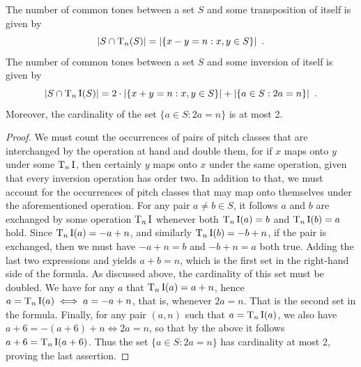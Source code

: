 \begin{theorem}
	\label{rahn-common-tone}
	\cite[10]{Rahn1975}
	The number of common tones between a set $S$ and some transposition of itself is given by
	\begin{equation}
		|S \cap \operatorname{T}_n(S)| = |\{x - y = n : x, y \in S\}| \enspace.
	\end{equation}
	The number of common tones between a set $S$ and some inversion of itself is given by
	\begin{equation}
		|S \cap \operatorname{T}_n\operatorname{I}(S)| = 2 \cdot |\{x + y = n : x, y \in S\}| + |\{a \in S : 2a = n\}| \enspace.
	\end{equation}
	Moreover, the cardinality of the set $\{a \in S : 2a = n\}$ is at most 2.
	\begin{proof}
		We must count the occurrences of pairs of pitch classes that are interchanged by the operation at hand and double them, for if $x$ maps onto $y$ under some $\operatorname{T}_n\operatorname{I}$, then certainly $y$ maps onto $x$ under the same operation, given that every inversion operation has order two. In addition to that, we must account for the occurrences of pitch classes that may map onto themselves under the aforementioned operation. For any pair $a \ne b \in S$, it follows $a$ and $b$ are exchanged by some operation $\operatorname{T}_n\operatorname{I}$ whenever both $\operatorname{T}_n\operatorname{I}(a) = b$ and $\operatorname{T}_n\operatorname{I}(b) = a$ hold. Since $\operatorname{T}_n\operatorname{I}(a) = -a + n$, and similarly $\operatorname{T}_n\operatorname{I}(b) = -b + n$, if the pair is exchanged, then we must have $-a + n = b$ and $-b + n = a$ both true. Adding the last two expressions and yields $a + b = n$, which is the first set in the right-hand side of the formula. As discussed above, the cardinality of this set must be doubled. We have for any $a$ that $\operatorname{T}_n\operatorname{I}(a) = a + n$, hence $a = \operatorname{T}_n\operatorname{I}(a) \iff a = -a + n$, that is, whenever $2a = n$. That is the second set in the formula. Finally, for any pair $(a, n)$ such that $a = \operatorname{T}_n\operatorname{I}(a)$, we also have $a + 6 = -(a + 6) + n \iff 2a = n$, so that by the above it follows $a + 6 = \operatorname{T}_n\operatorname{I}(a + 6)$. Thus the set $\{a \in S : 2a = n\}$ has cardinality at most 2, proving the last assertion.
	\end{proof}
\end{theorem}

